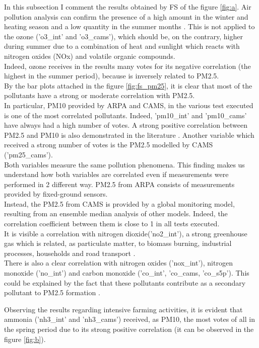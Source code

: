In this subsection I comment the results obtained by FS of the figure \ref{fig:a}.
Air pollution analysis can confirm the presence of a high amount in the winter and heating season and a low quantity in the summer months \cite{cichowicz2017dispersion}. This is not applied to the ozone ('o3\_int' and 'o3\_cams'), which should be, on the contrary, higher during summer due to a combination of heat and sunlight which reacts with nitrogen oxides (NOx) and volatile organic compounds.\\
Indeed, ozone receives in the results many votes for its negative correlation (the highest in the summer period), because is inversely related to PM2.5.\\
By the bar plots attached in the figure \ref{fig:fs_pm25}, it is clear that most of the pollutants have a strong or moderate correlation with PM2.5. \\
In particular, PM10 provided by ARPA and CAMS, in the various test executed is one of the most correlated pollutants. Indeed, 'pm10\_int' and 'pm10\_cams' have always had a high number of votes.
A strong positive correlation between PM2.5 and PM10 is also demonstrated in the literature \cite{zhou2016concentrations}.
Another variable which received a strong number of votes is the PM2.5 modelled by CAMS ('pm25\_cams'). \\
Both variables measure the same pollution phenomena.
This finding makes us understand how both variables are correlated even if measurements were performed in 2 different way. PM2.5 from ARPA consists of measurements provided by fixed-ground sensors.\\
Instead, the PM2.5 from CAMS is provided by a global monitoring model, resulting from an ensemble median analysis of other models.
Indeed, the correlation coefficient between them is close to 1 in all tests executed.\\
It is visible a correlation with nitrogen dioxide('no2\_int'), a strong greenhouse gas which is related, as particulate matter, to biomass burning, industrial processes, households and road transport \cite{zellner2000john} \cite{maranzano2022air}.\\
There is also a clear correlation with nitrogen oxides ('nox\_int'), nitrogen monoxide ('no\_int') and carbon monoxide ('co\_int', 'co\_cams, 'co\_s5p'). This could be explained by the fact that these pollutants contribute as a secondary pollutant to PM2.5 formation \cite{xie2015spatiotemporal}.
\par
Observing the results regarding intensive farming activities, it is evident that ammonia ('nh3\_int' and 'nh3\_cams') received, as PM10, the most votes of all in the spring period due to its strong positive correlation (it can be observed in the figure \ref{fig:b}). \\
